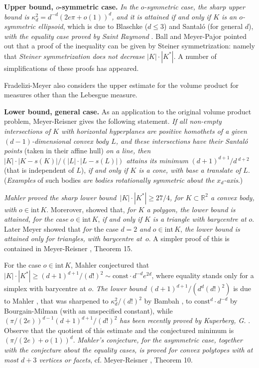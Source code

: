 \documentclass[12pt]{article}
\begin{document}
{\bf{Upper bound, $o$-symmetric case.}}
{\it{In the $o$-symmetric case, 
the sharp upper bound is $\kappa _d ^2=d^{-d}\left( 2e \pi +o(1) \right) ^d$,
and it
is attained if and only if $K$ is an $o$-symmetric ellipsoid}},
which is due to Blaschke \cite{Bl} ($d \le 3$) and Santal\'o \cite{San} 
(for general $d$), 
{\it{with the equality case proved by Saint Raymond}} \cite{SR}. 
Ball \cite{Bal} and Meyer-Pajor \cite{MP89} pointed
out that a proof of the inequality can be given by Steiner symmetrization:
namely that {\it{Steiner symmetrization does not decrease}} $|K| \cdot |K^*|$.
A number of simplifications of these
proofs has appeared.

Fradelizi-Meyer 
\cite{FM07} also considers the upper estimate for the volume product for
measures other than the Lebesgue measure.

{\bf{Lower bound, general case.}}
As an application to the original volume product problem, Meyer-Reisner
\cite{MR98} gives
the following statement. 
{\it{If all non-empty intersections of $K$ with horizontal
hyperplanes are positive
homothets of a given $(d-1)$-dimensional convex body $L$, and
these intersections have their 
Santal\'o points}} (taken in their affine hull)
{\it{on a line,
then $|K| \cdot |K-s(K)|/(|L| \cdot |L-s(L)|)$ attains its minimum}}
$(d+1)^{d+1}/d\,^{d+2}$ (that is independent of $L$), {\it{if and
only if $K$ is a cone, with base a translate of}} $L$. ({\it{Examples}} 
of such bodies
{\it{are bodies rotationally symmetric about the $x_d$-axis}}.) 

{\it{Mahler}} \cite{Mah38} {\it{proved the sharp lower 
bound \,$|K| \cdot |K^*| \ge 27/4$,
for $K \subset {\mathbb
R}^2$ a convex body, with}} $o \in {\text{int}}\,K$.
Morerover, \cite{Mah38} showed that, {\it{for $K$ a
polygon, the lower bound is attained, for the
case}} $o \in {\text{int}}\,K$,
{\it{if and only if $K$ is 
a triangle with barycentre at $o$}}. Later Meyer \cite{Me91} 
showed that {\it{for}} the case $d=2$ {\it{and}} $o \in {\text{int}}\,K$,
{\it{the lower bound is attained only for triangles, with barycentre 
at}}\, $o$.
A simpler proof of this is contained in Meyer-Reisner \cite{MR06}, 
Theorem 15.

For the case $o \in {\text{int}}\,K$, Mahler \cite{Mah39} 
conjectured that $|K| \cdot |K^*| 
\ge (d+1)^{d+1}/(d!)^2 \sim {\text{const}} \cdot d^{-d}e^{2d}$, 
where equality stands only for a simplex with barycentre at
$o$. {\it{The lower bound}} $(d+1)^{d+1}/\left( d^d(d!)^2 \right) $ 
is due to Mahler \cite{Mah50}, 
that was sharpened
to $\kappa _d^2/(d!)^2$ by Bambah \cite{Bam}, 
to ${\text{const}} ^d \cdot d^{-d}$ 
by Bourgain-Milman \cite{BoMi}
(with an unspecified constant), while 
$\left( \pi /(2e) \right) ^{d-1} (d+1)^{d+1}/(d!)^2$ 
{\it{has been recently proved by
Kuperberg, G.}} \cite{K08}. Observe that the quotient of
this estimate and the
conjectured minimum is $\left( \pi / (2e) + o(1) \right) ^d$.
{\it{Mahler's conjecture, for the asymmetric case, together with the conjecture
about the equality cases,
is proved for convex polytopes with at most $d+3$ vertices or facets}}, 
cf. Meyer-Reisner \cite{MR06}, Theorem 10.
\end{document}
